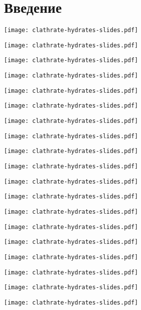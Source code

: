 \documentclass[main.tex]{subfiles}
\begin{document}
\section{Введение}

\texttt{[image: clathrate-hydrates-slides.pdf]}

\texttt{[image: clathrate-hydrates-slides.pdf]}

\texttt{[image: clathrate-hydrates-slides.pdf]}

\texttt{[image: clathrate-hydrates-slides.pdf]}

\texttt{[image: clathrate-hydrates-slides.pdf]}

\texttt{[image: clathrate-hydrates-slides.pdf]}

\texttt{[image: clathrate-hydrates-slides.pdf]}

\texttt{[image: clathrate-hydrates-slides.pdf]}

\texttt{[image: clathrate-hydrates-slides.pdf]}

\texttt{[image: clathrate-hydrates-slides.pdf]}

\texttt{[image: clathrate-hydrates-slides.pdf]}

\texttt{[image: clathrate-hydrates-slides.pdf]}

\texttt{[image: clathrate-hydrates-slides.pdf]}

\texttt{[image: clathrate-hydrates-slides.pdf]}

\texttt{[image: clathrate-hydrates-slides.pdf]}

\texttt{[image: clathrate-hydrates-slides.pdf]}

\texttt{[image: clathrate-hydrates-slides.pdf]}

\texttt{[image: clathrate-hydrates-slides.pdf]}

\texttt{[image: clathrate-hydrates-slides.pdf]}

\newpage

\ \\
\end{document}
